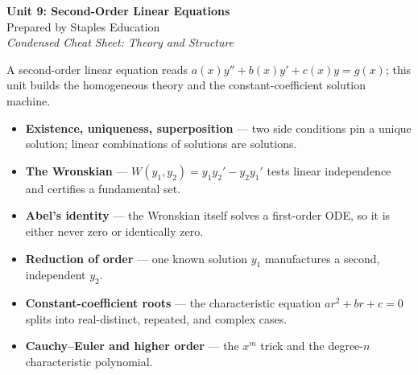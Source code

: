 




\begin{center}
    {\LARGE \bfseries Unit 9: Second-Order Linear Equations}\\[6pt]
    {\large Prepared by Staples Education}\\[4pt]
    {\itshape Condensed Cheat Sheet: Theory and Structure}
\end{center}

\vspace{0.4em}

\begin{topicsbox}
A second-order linear equation reads
$a(x)y'' + b(x)y' + c(x)y = g(x)$; this unit builds the homogeneous theory and the
constant-coefficient solution machine.
\begin{itemize}[leftmargin=1.4em, itemsep=3pt]
    \item \textbf{Existence, uniqueness, superposition} --- two side conditions
          pin a unique solution; linear combinations of solutions are solutions.
    \item \textbf{The Wronskian} --- $W(y_1,y_2)=y_1y_2'-y_2y_1'$ tests linear
          independence and certifies a fundamental set.
    \item \textbf{Abel's identity} --- the Wronskian itself solves a first-order
          ODE, so it is either never zero or identically zero.
    \item \textbf{Reduction of order} --- one known solution $y_1$ manufactures a
          second, independent $y_2$.
    \item \textbf{Constant-coefficient roots} --- the characteristic equation
          $ar^2+br+c=0$ splits into real-distinct, repeated, and complex cases.
    \item \textbf{Cauchy--Euler and higher order} --- the $x^m$ trick and the
          degree-$n$ characteristic polynomial.
\end{itemize}
\end{topicsbox}

